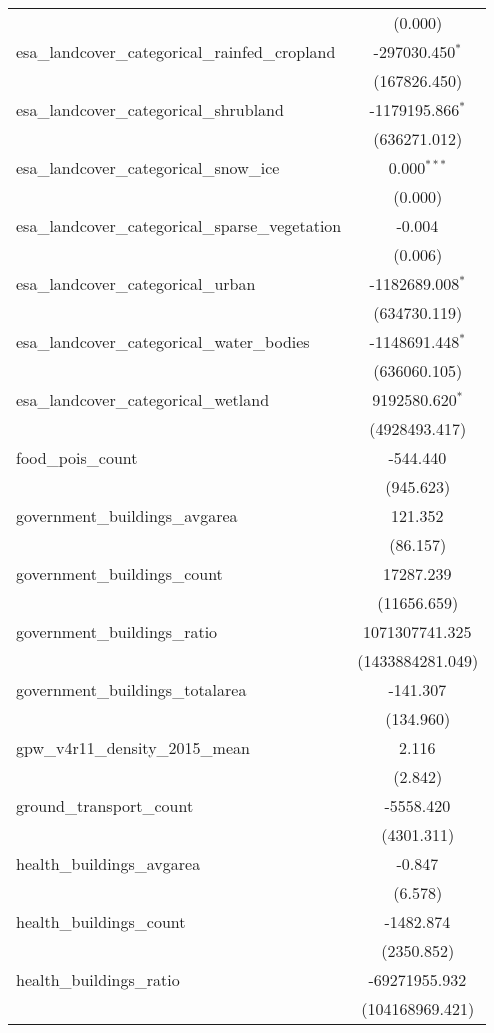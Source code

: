 \begin{table}[!htbp]
\begin{tabular}{@{\extracolsep{5pt}}lc}
  & (0.000) \\
 esa_landcover_categorical_rainfed_cropland & -297030.450$^{*}$ \\
  & (167826.450) \\
 esa_landcover_categorical_shrubland & -1179195.866$^{*}$ \\
  & (636271.012) \\
 esa_landcover_categorical_snow_ice & 0.000$^{***}$ \\
  & (0.000) \\
 esa_landcover_categorical_sparse_vegetation & -0.004$^{}$ \\
  & (0.006) \\
 esa_landcover_categorical_urban & -1182689.008$^{*}$ \\
  & (634730.119) \\
 esa_landcover_categorical_water_bodies & -1148691.448$^{*}$ \\
  & (636060.105) \\
 esa_landcover_categorical_wetland & 9192580.620$^{*}$ \\
  & (4928493.417) \\
 food_pois_count & -544.440$^{}$ \\
  & (945.623) \\
 government_buildings_avgarea & 121.352$^{}$ \\
  & (86.157) \\
 government_buildings_count & 17287.239$^{}$ \\
  & (11656.659) \\
 government_buildings_ratio & 1071307741.325$^{}$ \\
  & (1433884281.049) \\
 government_buildings_totalarea & -141.307$^{}$ \\
  & (134.960) \\
 gpw_v4r11_density_2015_mean & 2.116$^{}$ \\
  & (2.842) \\
 ground_transport_count & -5558.420$^{}$ \\
  & (4301.311) \\
 health_buildings_avgarea & -0.847$^{}$ \\
  & (6.578) \\
 health_buildings_count & -1482.874$^{}$ \\
  & (2350.852) \\
 health_buildings_ratio & -69271955.932$^{}$ \\
  & (104168969.421) \\

\end{tabular}
\end{table}
